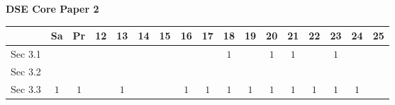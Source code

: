 \documentclass[12pt, a4paper]{article}
\begin{document}
\begin{absolutelynopagebreak}
\begin{center}
\textbf{DSE Core Paper 2}
\end{center}
\begin{center}
\begin{tabular}{|l|c|c|c|c|c|c|c|c|c|c|c|c|c|c|c|c|}
\hline
        & Sa & Pr & 12 & 13 & 14 & 15 & 16 & 17 & 18 & 19 & 20 & 21 & 22 & 23 & 24 & 25 \\\hline\hline
Sec 3.1 &  &  &  &  &  &  &  &  &  $1$ &  &  $1$ &  $1$ &  &  $1$ &  &  \\\hline
Sec 3.2 &  &  &  &  &  &  &  &  &  &  &  &  &  &  &  &  \\\hline
Sec 3.3 &  $1$ &  $1$ &  &  $1$ &  &  &  $1$ &  $1$ &  $1$ &  $1$ &  $1$ &  $1$ &  $1$ &  $1$ &  $1$ &  \\\hline
\end{tabular}
\end{center}
\end{absolutelynopagebreak}
\end{document}
